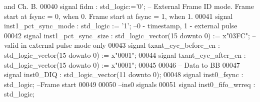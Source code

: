 \begin{DoxyCode}
{       and Ch. B. }
00040    \textcolor{keywordflow}{signal} \textcolor{vhdlchar}{fidm}             \textcolor{vhdlchar}{:} \textcolor{comment}{std\_logic}\textcolor{vhdlchar}{:=}\textcolor{vhdlchar}{'}\textcolor{vhdllogic}{}\textcolor{vhdllogic}{0}\textcolor{vhdlchar}{'};\textcolor{keyword}{ -- External Frame ID mode. Frame start at fsync = 0, when 0.
       Frame start at fsync = 1, when 1.}
00041    \textcolor{keywordflow}{signal} \textcolor{vhdlchar}{inst1_pct_sync_mode}    \textcolor{vhdlchar}{:} \textcolor{comment}{std\_logic} \textcolor{vhdlchar}{:=} \textcolor{vhdlchar}{'}\textcolor{vhdllogic}{}\textcolor{vhdllogic}{1}\textcolor{vhdlchar}{'};\textcolor{keyword}{ --0 - timestamp, 1 - external pulse }
00042    \textcolor{keywordflow}{signal} \textcolor{vhdlchar}{inst1_pct_sync_size}    \textcolor{vhdlchar}{:} \textcolor{comment}{std\_logic\_vector}\textcolor{vhdlchar}{(}\textcolor{vhdllogic}{}\textcolor{vhdllogic}{15} \textcolor{keywordflow}{downto} \textcolor{vhdllogic}{}\textcolor{vhdllogic}{0}\textcolor{vhdlchar}{)} \textcolor{vhdlchar}{:=} \textcolor{vhdlchar}{x}\textcolor{vhdllogic}{"03FC"};\textcolor{keyword}{ -- valid in external pulse
       mode only}
00043    \textcolor{keywordflow}{signal} \textcolor{vhdlchar}{txant_cyc_before_en}    \textcolor{vhdlchar}{:} \textcolor{comment}{std\_logic\_vector}\textcolor{vhdlchar}{(}\textcolor{vhdllogic}{}\textcolor{vhdllogic}{15} \textcolor{keywordflow}{downto} \textcolor{vhdllogic}{}\textcolor{vhdllogic}{0}\textcolor{vhdlchar}{)} \textcolor{vhdlchar}{:=} \textcolor{vhdlchar}{x}\textcolor{vhdllogic}{"0001"};
00044    \textcolor{keywordflow}{signal} \textcolor{vhdlchar}{txant_cyc_after_en}     \textcolor{vhdlchar}{:} \textcolor{comment}{std\_logic\_vector}\textcolor{vhdlchar}{(}\textcolor{vhdllogic}{}\textcolor{vhdllogic}{15} \textcolor{keywordflow}{downto} \textcolor{vhdllogic}{}\textcolor{vhdllogic}{0}\textcolor{vhdlchar}{)} \textcolor{vhdlchar}{:=} \textcolor{vhdlchar}{x}\textcolor{vhdllogic}{"0001"};
00045 
00046 \textcolor{keyword}{   -- Data to BB}
00047    \textcolor{keywordflow}{signal} \textcolor{vhdlchar}{inst0_DIQ}           \textcolor{vhdlchar}{:} \textcolor{comment}{std\_logic\_vector}\textcolor{vhdlchar}{(}\textcolor{vhdllogic}{}\textcolor{vhdllogic}{11} \textcolor{keywordflow}{downto} \textcolor{vhdllogic}{}\textcolor{vhdllogic}{0}\textcolor{vhdlchar}{)};
00048    \textcolor{keywordflow}{signal} \textcolor{vhdlchar}{inst0_fsync}         \textcolor{vhdlchar}{:} \textcolor{comment}{std\_logic};\textcolor{keyword}{ --Frame start}
00049 
00050 \textcolor{keyword}{   --ins0 signals}
00051    \textcolor{keywordflow}{signal} \textcolor{vhdlchar}{inst0_fifo_wrreq}    \textcolor{vhdlchar}{:} \textcolor{comment}{std\_logic};

\end{DoxyCode}

